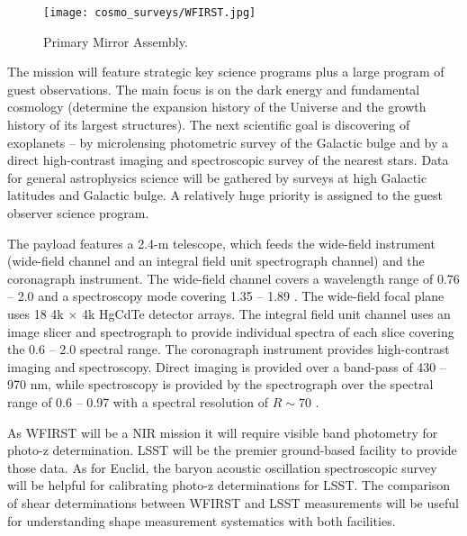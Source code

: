 \begin{figure}[htb]
    \centering
    \texttt{[image: cosmo\_surveys/WFIRST.jpg]}
    \caption{Primary Mirror Assembly.}
    \label{fig:wfirst}
\end{figure}
The mission will feature strategic key science programs plus a large program of guest observations. The main focus is on the dark energy and fundamental cosmology (determine the expansion history of the Universe and the growth history of its largest structures). The next scientific goal is discovering of exoplanets -- by microlensing photometric survey of the Galactic bulge and by a direct high-contrast imaging and spectroscopic survey of the nearest stars. Data for general astrophysics science will be gathered by surveys at high Galactic latitudes and Galactic bulge. A relatively huge priority is assigned to the guest observer science program.

The payload features a 2.4-m telescope, which feeds the wide-field instrument (wide-field channel and an integral field unit spectrograph channel) and the coronagraph instrument. The wide-field channel covers a wavelength range of 0.76 -- 2.0 \um and a spectroscopy mode covering 1.35 -- 1.89 \um. The wide-field focal plane uses 18 4k $\times$ 4k HgCdTe detector arrays. The integral field unit channel uses an image slicer and spectrograph to provide individual spectra of each slice covering the 0.6 -- 2.0 \um spectral range. The coronagraph instrument provides high-contrast imaging and spectroscopy. Direct imaging is provided over a band-pass of 430 -- 970 nm, while spectroscopy is provided by the spectrograph over the spectral range of 0.6 -- 0.97 \um with a spectral resolution of $R\sim70$ \cite{WFIRST_report}.

As WFIRST will be a NIR mission it will require visible band photometry for photo-z determination. LSST will be the premier ground-based facility to provide those data. As for Euclid, the baryon acoustic oscillation spectroscopic survey will be helpful for calibrating photo-z determinations for LSST. The comparison of shear determinations between WFIRST and LSST measurements will be useful for understanding shape measurement systematics with both facilities.